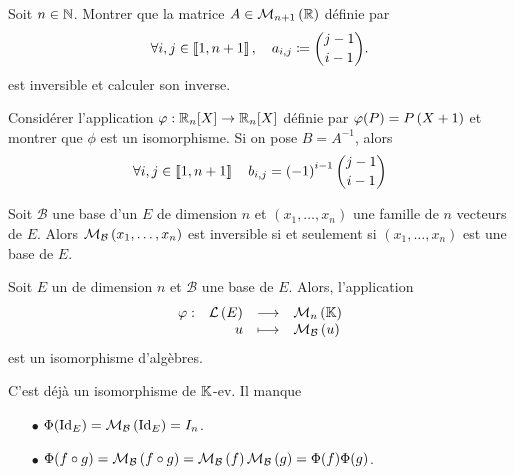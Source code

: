 \documentclass{magnolia}
\begin{document}
\begin{exoUnique}
\exo Soit $n\in\mathbb{N}$. Montrer que la matrice $A\in\mathcal{M}_{n+1}\left(\mathbb{R}\right)$ définie par
  \[\forall i,j\in\left\llbracket 1,n+1\right\rrbracket ,\quad a_{i,j}\coloneqq\binom{j-1}{i-1}.\]
  est inversible et calculer son inverse.
  \begin{sol}
  Considérer l'application $\phi:\polyR[n]\to\polyR[n]$ définie par
  $\varphi(P)=P\left(X+1\right)$ et montrer que $\phi$ est un isomorphisme. Si on pose
  $B=A^{-1}$, alors
  \[\forall i,j\in\left\llbracket 1,n+1\right\rrbracket \quad b_{i,j}=\left(-1\right)^{i-1}\binom{j-1}{i-1}\]
  \end{sol}
\end{exoUnique}

\begin{proposition}[utile=-3]
Soit $\mathcal{B}$ une base d'un \Kev $E$ de dimension $n$ et
$(x_1,\ldots,x_n)$ une famille de $n$ vecteurs de $E$. Alors
$\mathcal{M}_{\mathcal{B}}\left(x_1,\ldots,x_n\right)$ est inversible si et seulement si
$(x_1,\ldots,x_n)$ est une base de $E$.
\end{proposition}

\begin{proposition}[utile=-3]
Soit $E$ un \Kev de dimension $n$ et $\mathcal{B}$ une base de $E$. Alors,
l'application
\[\begin{array}[t]{lrcl} \displaystyle{\varphi} : & \displaystyle{\mathcal{L}\left(E\right)} & \longrightarrow & \displaystyle{\mathcal{M}_{n}\left(\ensuremath{\mathbb{K}}\right)} \\ & \displaystyle{u} & \longmapsto & \displaystyle{\mathcal{M}_{\mathcal{B}}\left(u\right)} \end{array}\]
est un isomorphisme d'algèbres.
\end{proposition}

\begin{preuve}
C'est déjà un isomorphisme de $\mathbb{K}$-ev. Il manque 
\begin{itemize}
\item[$\bullet$] $\Phi(\operatorname{Id}_E)=\mathcal{M}_{\mathcal{B}}\left(\operatorname{Id}_E\right)=I_n$.
\item[$\bullet$]$\Phi(f\circ g)=\mathcal{M}_{\mathcal{B}}\left(f\circ g\right)=\mathcal{M}_{\mathcal{B}}\left(f\right)\mathcal{M}_{\mathcal{B}}\left(g\right)=\Phi(f)\Phi(g)$.
\end{itemize}
\end{preuve}
\end{document}
